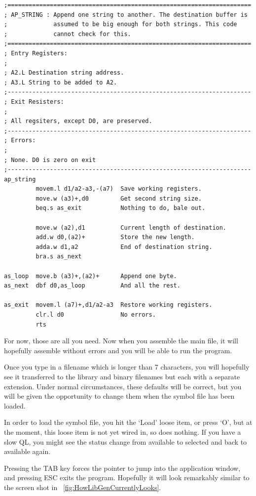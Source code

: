 \begin{lstlisting}[firstnumber=1,]
;=====================================================================
; AP_STRING : Append one string to another. The destination buffer is
;             assumed to be big enough for both strings. This code
;             cannot check for this.
;=====================================================================
; Entry Registers:
;
; A2.L Destination string address.
; A3.L String to be added to A2.
;---------------------------------------------------------------------
; Exit Resisters:
;
; All regsiters, except D0, are preserved.
;---------------------------------------------------------------------
; Errors:
;
; None. D0 is zero on exit
;---------------------------------------------------------------------
ap_string
         movem.l d1/a2-a3,-(a7)  Save working registers.
         move.w (a3)+,d0         Get second string size.
         beq.s as_exit           Nothing to do, bale out.

         move.w (a2),d1          Current length of destination.
         add.w d0,(a2)+          Store the new length.
         adda.w d1,a2            End of destination string.
         bra.s as_next

as_loop  move.b (a3)+,(a2)+      Append one byte.
as_next  dbf d0,as_loop          And all the rest.

as_exit  movem.l (a7)+,d1/a2-a3  Restore working registers.
         clr.l d0                No errors.
         rts
\end{lstlisting}

For now, those are all you need. Now when you assemble the main
    file, it will hopefully assemble without errors and you will be able to
    run the program.

Once you type in a filename which is longer than 7 characters, you
    will hopefully see it transferred to the library and binary filenames but
    each with a separate extension. Under normal circumstances, these defaults
    will be correct, but you will be given the opportunity to change them when
    the symbol file has been loaded.

In order to load the symbol file, you hit the `Load' loose item, or
    press `O', but at the moment, this loose item is not yet wired in, so does
    nothing. If you have a slow QL, you might see the status change from
    available to selected and back to available again.

Pressing the TAB key forces the pointer to jump into the application
    window, and pressing ESC exits the program. Hopefully it will look
    remarkably similar to the screen shot in \figurename~\ref{fig:HowLibGenCurrentlyLooks}.

